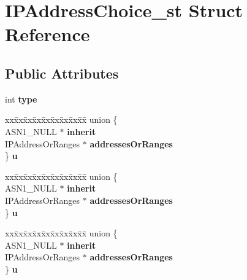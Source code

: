 \hypertarget{structIPAddressChoice__st}{}\section{I\+P\+Address\+Choice\+\_\+st Struct Reference}
\label{structIPAddressChoice__st}
\subsection*{Public Attributes}
\begin{DoxyCompactItemize}
\item 
\mbox{\label{structIPAddressChoice__st_a7682bd3a3f986e97124f6f3443a094a1}} 
int {\bfseries type}
\item 
\mbox{\label{structIPAddressChoice__st_a3bbd60b56da9dfc5bd31355a896dfef5}} 
\begin{tabbing}
xx\=xx\=xx\=xx\=xx\=xx\=xx\=xx\=xx\=\kill
union \{\\
\>ASN1\_NULL $\ast$ {\bfseries inherit}\\
\>IPAddressOrRanges $\ast$ {\bfseries addressesOrRanges}\\
\} {\bfseries u}\\

\end{tabbing}\item 
\mbox{\label{structIPAddressChoice__st_a44e0b28460734ea66956dd6aafedf284}} 
\begin{tabbing}
xx\=xx\=xx\=xx\=xx\=xx\=xx\=xx\=xx\=\kill
union \{\\
\>ASN1\_NULL $\ast$ {\bfseries inherit}\\
\>IPAddressOrRanges $\ast$ {\bfseries addressesOrRanges}\\
\} {\bfseries u}\\

\end{tabbing}\item 
\mbox{\label{structIPAddressChoice__st_af1c226e7d9890e3d948b6bd95b040c5c}} 
\begin{tabbing}
xx\=xx\=xx\=xx\=xx\=xx\=xx\=xx\=xx\=\kill
union \{\\
\>ASN1\_NULL $\ast$ {\bfseries inherit}\\
\>IPAddressOrRanges $\ast$ {\bfseries addressesOrRanges}\\
\} {\bfseries u}\\


\end{tabbing}
\end{DoxyCompactItemize}

